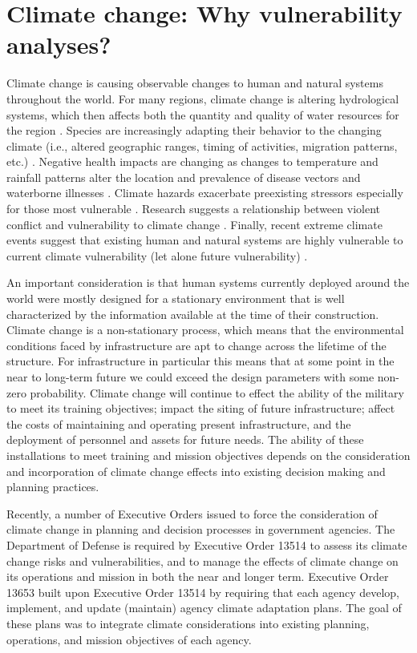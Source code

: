 \documentclass[10pt]{amsart}
\begin{document}
\section{Climate change: Why vulnerability analyses?}
Climate change is causing observable changes to human and natural systems throughout the world.
For many regions, climate change is altering hydrological systems, which then affects both the quantity and quality of water resources for the region \parencite{field2014summary}.
Species are increasingly adapting their behavior to the changing climate (i.e., altered geographic ranges, timing of activities, migration patterns, etc.) \parencite{field2014summary}.
Negative health impacts are changing as changes to temperature and rainfall patterns alter the location and prevalence of disease vectors and waterborne illnesses \parencite{field2014summary}.
Climate hazards exacerbate preexisting stressors especially for those most vulnerable \parencite{field2014summary}.
Research suggests a relationship between violent conflict and vulnerability to climate change \parencite{field2014summary}.
Finally, recent extreme climate events suggest that existing human and natural systems are highly vulnerable to current climate vulnerability (let alone future vulnerability) \parencite{field2014summary}.

An important consideration is that human systems currently deployed around the world were mostly designed for a stationary environment that is well characterized by the information available at the time of their construction.
Climate change is a non-stationary process, which means that the environmental conditions faced by infrastructure are apt to change across the lifetime of the structure. 
For infrastructure in particular this means that at some point in the near to long-term future we could exceed the design parameters with some non-zero probability.
Climate change will continue to effect the ability of the military to meet its training objectives; impact the siting of future infrastructure; affect the costs of maintaining and operating present infrastructure, and the deployment of personnel and assets for future needs.
The ability of these installations to meet training and mission objectives depends on the consideration and incorporation of climate change effects into existing decision making and planning practices. 

Recently, a number of Executive Orders issued to force the consideration of climate change in planning and decision processes in government agencies. 
The Department of Defense is required by Executive Order 13514 to assess its climate change risks and vulnerabilities, and to manage the effects of climate change on its operations and mission in both the near and longer term. 
Executive Order 13653 built upon Executive Order 13514 by requiring that each agency develop, implement, and update (maintain) agency climate adaptation plans.
The goal of these plans was to integrate climate considerations into existing planning, operations, and mission objectives of each agency.
\end{document}
